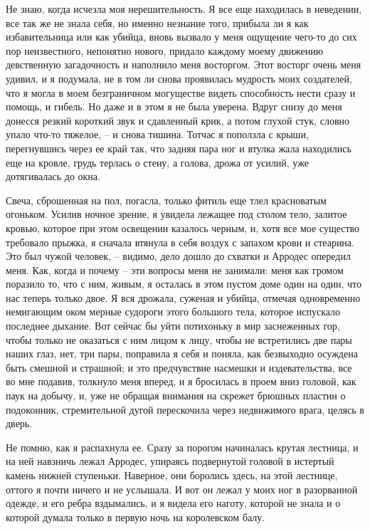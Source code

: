 Не знаю, когда исчезла моя нерешительность.  Я  все  еще  находилась  в
неведении,  все  так же не знала себя, но именно незнание того, прибыла ли я
как избавительница или как убийца, вновь вызвало у меня ощущение чего-то  до
сих  пор  неизвестного,  непонятно  нового,  придало  каждому моему движению
девственную загадочность и наполнило меня восторгом. Этот восторг очень меня
удивил, и я подумала, не в том ли снова проявилась мудрость моих создателей,
что я могла в моем безграничном могуществе видеть способность нести сразу  и
помощь,  и  гибель.  Но даже и в этом я не была уверена. Вдруг снизу до меня
донесся резкий короткий звук и сдавленный крик, а потом глухой стук,  словно
упало  что-то  тяжелое,  --  и  снова  тишина.  Тотчас  я  поползла с крыши,
перегнувшись через ее край так, что задняя пара ног и втулка жала находились
еще на кровле, грудь терлась  о  стену,  а  голова,  дрожа  от  усилий,  уже
дотягивалась до окна.

Свеча,  сброшенная  на пол, погасла, только фитиль еще тлел красноватым
огоньком. Усилив ночное зрение, я увидела лежащее под столом  тело,  залитое
кровью, которое при этом освещении казалось черным, и, хотя все мое существо
требовало  прыжка,  я  сначала  втянула  в  себя  воздух  с  запахом крови и
стеарина. Это был чужой человек, -- видимо, дело дошло до схватки и  Арродес
опередил меня. Как, когда и почему -- эти вопросы меня не занимали: меня как
громом  поразило то, что с ним, живым, я осталась в этом пустом доме один на
один, что нас теперь только двое. Я вся дрожала, суженая и  убийца,  отмечая
одновременно  немигающим  оком  мерные судороги этого большого тела, которое
испускало последнее дыхание. Вот сейчас бы уйти потихоньку в мир заснеженных
гор, чтобы только не оказаться с ним лицом к лицу, чтобы не встретились  две
пары  наших  глаз,  нет, три пары, поправила я себя и поняла, как безвыходно
осуждена  быть  смешной  и  страшной;  и   это   предчувствие   насмешки   и
издевательства,  все  во  мне подавив, толкнуло меня вперед, и я бросилась в
проем вниз головой, как паук на  добычу,  и,  уже  не  обращая  внимания  на
скрежет  брюшных пластин о подоконник, стремительной дугой перескочила через
недвижимого врага, целясь в дверь.

Не помню, как я распахнула  ее.  Сразу  за  порогом  начиналась  крутая
лестница,  и  на  ней навзничь лежал Арродес, упираясь подвернутой головой в
истертый камень нижней ступеньки. Наверное,  они  боролись  здесь,  на  этой
лестнице,  оттого  я почти ничего и не услышала. И вот он лежал у моих ног в
разорванной одежде, и его ребра вздымались, и я видела его  наготу,  которой
не знала и о которой думала только в первую ночь на королевском балу.

